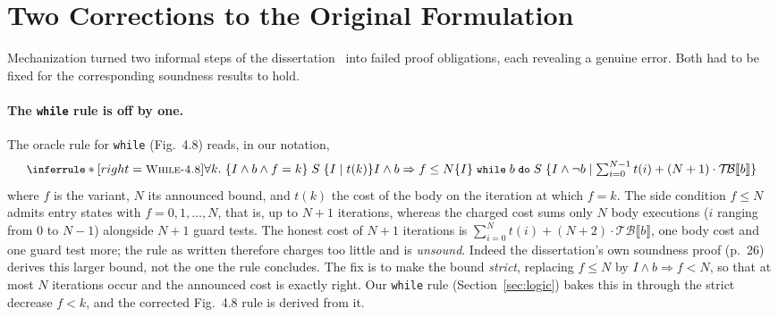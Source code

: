 \documentclass[runningheads]{llncs}
\newcommand{\tbcost}[1]{\mathcal{T\!B}\llbracket #1 \rrbracket}
\newcommand{\triple}[4]{\{#1\}\;#2\;\{#3 \mid #4\}}
\newcommand{\code}[1]{\texttt{#1}}
\begin{document}
\section{Two Corrections to the Original Formulation}\label{sec:deviations}

Mechanization turned two informal steps of the dissertation~\cite{Silva2022} into failed proof
obligations, each revealing a genuine error. Both had to be fixed for the
corresponding soundness results to hold.

\paragraph{The \code{while} rule is off by one.}
The oracle rule for \code{while} (Fig.~4.8) reads, in our notation,
\[
{\small
\inferrule*[right=\textsc{While-4.8}]
{ \forall k.\ \triple{I \wedge b \wedge f = k}{S}{I}{t(k)}
  \\ I \wedge b \Rightarrow f \le N }
{ \triple{I}{\code{while}\;b\;\code{do}\;S}{I \wedge \neg b}
  {\textstyle\sum_{i=0}^{N-1} t(i) + (N+1)\cdot\tbcost{b}} }
}
\]
where $f$ is the variant, $N$ its announced bound, and $t(k)$ the cost of the body
on the iteration at which $f = k$.
The side condition $f \le N$ admits entry states with $f = 0, 1, \ldots, N$, that
is, up to $N+1$ iterations, whereas the charged cost sums only $N$ body executions
($i$ ranging from $0$ to $N-1$) alongside $N+1$ guard tests.
The honest cost of $N+1$ iterations is $\sum_{i=0}^{N} t(i) + (N+2)\cdot\tbcost{b}$,
one body cost and one guard test more; the rule as written therefore charges too
little and is \emph{unsound}. Indeed the dissertation's own soundness proof
(p.~26) derives this larger bound, not the one the rule concludes.
The fix is to make the bound \emph{strict}, replacing $f \le N$ by
$I \wedge b \Rightarrow f < N$, so that at most $N$ iterations occur and the
announced cost is exactly right.
Our \code{while} rule (Section~\ref{sec:logic}) bakes this in through the
strict decrease $f < k$, and the corrected Fig.~4.8 rule is derived from it.
\end{document}
